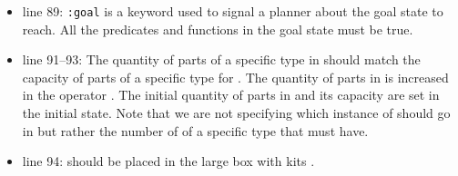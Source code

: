 \begin{itemize}
\item line 89: \texttt{:goal} is a keyword used to signal a planner about the goal state to reach. All the predicates and functions in the goal state must be true.
\item line 91--93: The quantity of parts of a specific type in  should match the capacity of parts of a specific type for . The quantity of parts in  is increased in the operator . The initial quantity of parts in  and its capacity are set in the initial state. Note that we are not specifying which instance of  should go in  but rather the number of  of a specific type that  must have.
\item line 94:  should be placed in the large box with kits .
\end{itemize}

